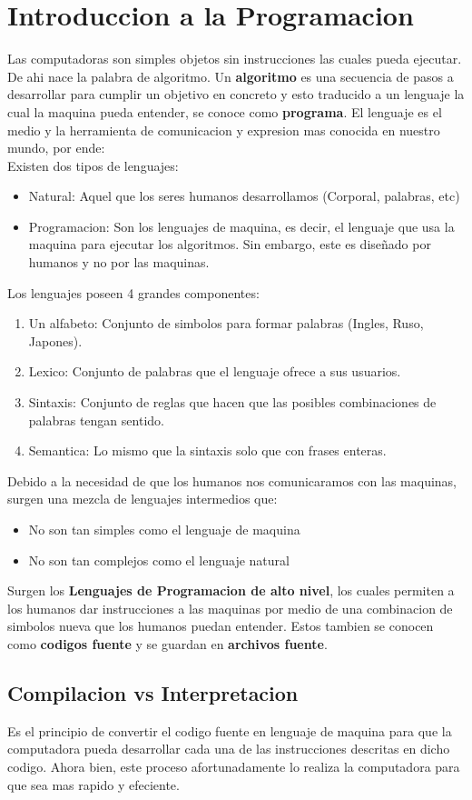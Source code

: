\documentclass{article}
\begin{document}
\section{Introduccion a la Programacion}
Las computadoras son simples objetos sin instrucciones las cuales pueda ejecutar. De ahi nace la palabra de algoritmo. Un \textbf{algoritmo} es una secuencia de pasos a desarrollar para cumplir un objetivo en concreto y esto traducido a un lenguaje la cual la maquina pueda entender, se conoce como \textbf{programa}. El lenguaje es el medio y la herramienta de comunicacion y expresion mas conocida en nuestro mundo, por ende: \\
Existen dos tipos de lenguajes:
\begin{itemize}
    \item Natural: Aquel que los seres humanos desarrollamos (Corporal, palabras, etc)
    \item Programacion: Son los lenguajes de maquina, es decir, el lenguaje que usa la maquina para ejecutar los algoritmos. Sin embargo, este es diseñado por humanos y no por las maquinas.
\end{itemize}
Los lenguajes poseen 4 grandes componentes:
\begin{enumerate}
    \item Un alfabeto: Conjunto de simbolos para formar palabras (Ingles, Ruso, Japones).
    \item Lexico: Conjunto de palabras que el lenguaje ofrece a sus usuarios. 
    \item Sintaxis: Conjunto de reglas que hacen que las posibles combinaciones de palabras tengan sentido.
    \item Semantica: Lo mismo que la sintaxis solo que con frases enteras.
\end{enumerate}
Debido a la necesidad de que los humanos nos comunicaramos con las maquinas, surgen una mezcla de lenguajes intermedios que:
\begin{itemize}
    \item No son tan simples como el lenguaje de maquina
    \item No son tan complejos como el lenguaje natural
\end{itemize}
Surgen los \textbf{Lenguajes de Programacion de alto nivel}, los cuales permiten a los humanos dar instrucciones a las maquinas por medio de una combinacion de simbolos nueva que los humanos puedan entender. Estos tambien se conocen como \textbf{codigos fuente} y se guardan en \textbf{archivos fuente}.
\subsection{Compilacion vs Interpretacion}
Es el principio de convertir el codigo fuente en lenguaje de maquina para que la computadora pueda desarrollar cada una de las instrucciones descritas en dicho codigo. Ahora bien, este proceso afortunadamente lo realiza la computadora para que sea mas rapido y efeciente. 
\end{document}
